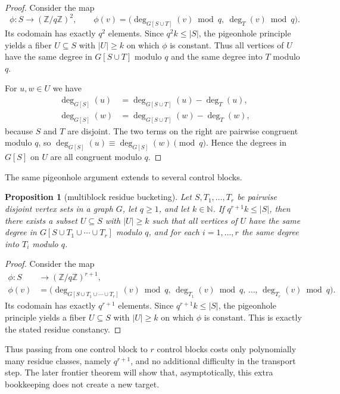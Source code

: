 \documentclass[11pt]{amsart}
\newtheorem{proposition}[theorem]{Proposition}
\theoremstyle{definition}
\newcommand{\N}{\mathbb{N}}
\newcommand{\Z}{\mathbb{Z}}
\begin{document}
\begin{proof}
Consider the map
\[
  \phi \colon S \to (\mathbb{Z}/q\mathbb{Z})^2,
  \qquad
  \phi(v)=\bigl(\deg_{G[S \cup T]}(v)\bmod q,\ \deg_T(v)\bmod q\bigr).
\]
Its codomain has exactly $q^2$ elements. Since $q^2 k \le |S|$, the pigeonhole principle yields a
fiber $U \subseteq S$ with $|U| \ge k$ on which $\phi$ is constant. Thus all vertices of $U$ have
the same degree in $G[S \cup T]$ modulo $q$ and the same degree into $T$ modulo $q$.

For $u,w \in U$ we have
\begin{align*}
  \deg_{G[S]}(u) &= \deg_{G[S \cup T]}(u)-\deg_T(u), \\
  \deg_{G[S]}(w) &= \deg_{G[S \cup T]}(w)-\deg_T(w),
\end{align*}
because $S$ and $T$ are disjoint. The two terms on the right are pairwise congruent modulo $q$, so
$\deg_{G[S]}(u)\equiv \deg_{G[S]}(w)\pmod q$. Hence the degrees in $G[S]$ on $U$ are all congruent
modulo $q$.
\end{proof}

The same pigeonhole argument extends to several control blocks.

\begin{proposition}[multiblock residue bucketing]\label{prop:multiblock-bucketing}
Let $S,T_1,\dots,T_r$ be pairwise disjoint vertex sets in a graph $G$, let $q \ge 1$, and let
$k \in \N$. If $q^{r+1}k \le |S|$, then there exists a subset $U \subseteq S$ with $|U| \ge k$
such that all vertices of $U$ have the same degree in $G[S \cup T_1 \cup \cdots \cup T_r]$
modulo $q$, and for each $i=1,\dots,r$ the same degree into $T_i$ modulo $q$.
\end{proposition}

\begin{proof}
Consider the map
\begin{align*}
  \phi \colon S &\to (\Z/q\Z)^{r+1}, \\
  \phi(v)&=\bigl(
    \deg_{G[S \cup T_1 \cup \cdots \cup T_r]}(v)\bmod q,\,
    \deg_{T_1}(v)\bmod q,\,
    \dots,\,
    \deg_{T_r}(v)\bmod q
  \bigr).
\end{align*}
Its codomain has exactly $q^{r+1}$ elements. Since $q^{r+1}k \le |S|$, the pigeonhole principle
yields a fiber $U \subseteq S$ with $|U| \ge k$ on which $\phi$ is constant. This is exactly the
stated residue constancy.
\end{proof}

Thus passing from one control block to $r$ control blocks costs only polynomially many residue
classes, namely $q^{r+1}$, and no additional difficulty in the transport step. The later frontier
theorem will show that, asymptotically, this extra bookkeeping does not create a new target.
\end{document}
